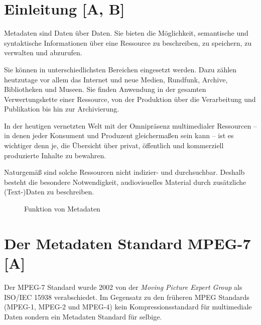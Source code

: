 	\section{Einleitung \hfill [A, B]}
	
	Metadaten sind Daten über Daten. Sie bieten die Möglichkeit, semantische und syntaktische Informationen über eine Ressource zu beschreiben, zu speichern, zu verwalten und abzurufen.
	
	Sie können in unterschiedlichsten Bereichen eingesetzt werden. Dazu zählen heutzutage vor allem das Internet und neue Medien, Rundfunk, Archive, Bibliotheken und Museen. Sie finden Anwendung in der gesamten Verwertungskette einer Ressource, von der Produktion über die Verarbeitung und Publikation bis hin zur Archivierung.

	In der heutigen vernetzten Welt mit der Omnipräsenz multimedialer Ressourcen -- in denen jeder Konsument und Produzent gleichermaßen sein kann -- ist es wichtiger denn je, die Übersicht über privat, öffentlich und kommerziell produzierte Inhalte zu bewahren.
	
	Naturgemäß sind solche Ressourcen nicht indizier- und durchsuchbar. Deshalb besteht die besondere Notwendigkeit, audiovisuelles Material durch zusätzliche (Text-)Daten zu beschreiben.

	\begin{figure}[htbp]
		\caption{Funktion von Metadaten}
		\label{myfigure}
	\end{figure}
	
	\clearpage
	
	\section {Der Metadaten Standard MPEG-7 \hfill [A]} 
	Der MPEG-7 Standard wurde 2002 von der \emph{Moving Picture Expert Group} als ISO/IEC 15938 verabschiedet. Im Gegensatz zu den früheren MPEG Standards (MPEG-1, MPEG-2 und MPEG-4) kein Kompressionsstandard für multimediale Daten sondern ein Metadaten Standard für selbige.
	
